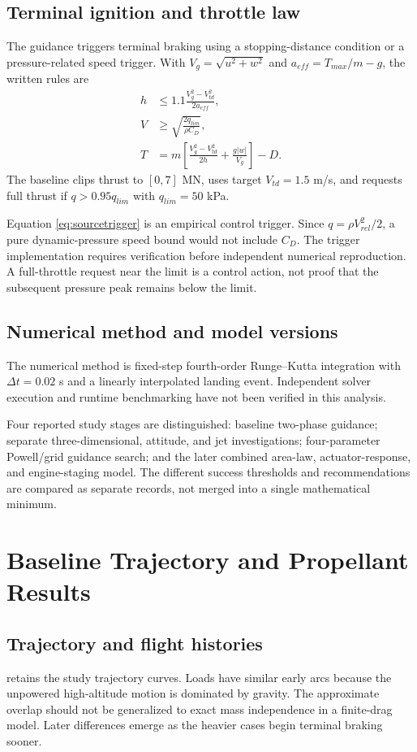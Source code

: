 \documentclass[11pt,a4paper]{article}
\begin{document}
\subsection{Terminal ignition and throttle law}
The guidance triggers terminal braking using a stopping-distance condition or a pressure-related speed trigger. With $V_g=\sqrt{u^2+w^2}$ and $a_{eff}=T_{max}/m-g$, the written rules are
\begin{align}
 h&\le1.1\frac{V_g^2-V_{td}^2}{2a_{eff}},\label{eq:stoprule}\\
 V&\ge\sqrt{\frac{2q_{lim}}{\rho C_D}},\label{eq:sourcetrigger}\\
 T&=m\left[\frac{V_g^2-V_{td}^2}{2h}+\frac{g|w|}{V_g}\right]-D.
\label{eq:thrustlaw}
\end{align}
The baseline clips thrust to $[0,7]$ MN, uses target $V_{td}=1.5$ m/s, and requests full thrust if $q>0.95q_{lim}$ with $q_{lim}=50$ kPa.

Equation \eqref{eq:sourcetrigger} is an empirical control trigger. Since $q=\rho V_{rel}^2/2$, a pure dynamic-pressure speed bound would not include $C_D$. The trigger implementation requires verification before independent numerical reproduction. A full-throttle request near the limit is a control action, not proof that the subsequent pressure peak remains below the limit.

\subsection{Numerical method and model versions}
The numerical method is fixed-step fourth-order Runge--Kutta integration with $\Delta t=0.02$ s and a linearly interpolated landing event. Independent solver execution and runtime benchmarking have not been verified in this analysis.

Four reported study stages are distinguished: baseline two-phase guidance; separate three-dimensional, attitude, and jet investigations; four-parameter Powell/grid guidance search; and the later combined area-law, actuator-response, and engine-staging model. The different success thresholds and recommendations are compared as separate records, not merged into a single mathematical minimum.

\section{Baseline Trajectory and Propellant Results}
\subsection{Trajectory and flight histories}
 retains the study trajectory curves. Loads have similar early arcs because the unpowered high-altitude motion is dominated by gravity. The approximate overlap should not be generalized to exact mass independence in a finite-drag model. Later differences emerge as the heavier cases begin terminal braking sooner.
\end{document}
